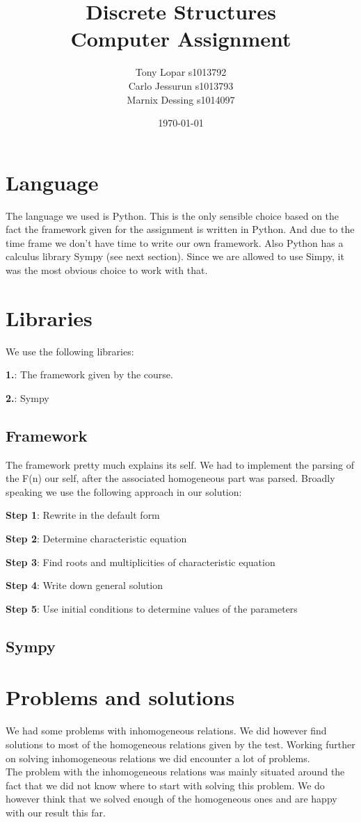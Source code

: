 \documentclass{article}
\begin{document}
\title{Discrete Structures \\ Computer Assignment}
\date{\today}
\author{Tony Lopar s1013792 \\ Carlo Jessurun s1013793 \\ Marnix Dessing s1014097}
\maketitle

\section{Language}
The language we used is Python. This is the only sensible choice based on the fact the framework given for the assignment is written in Python. And due to the time frame we don't have time to write our own framework. Also Python has a calculus library Sympy (see next section). Since we are allowed to use Simpy, it was the most obvious choice to work with that.

\section{Libraries}
We use the following libraries:

\textbf{1.}: The framework given by the course.

\textbf{2.}: Sympy

\subsection{Framework}
The framework pretty much explains its self.
We had to implement the parsing of the F(n) our self, after the associated homogeneous part was parsed. Broadly speaking we use the following approach in our solution:

\textbf{Step 1}: Rewrite in the default form

\textbf{Step 2}: Determine characteristic equation

\textbf{Step 3}: Find roots and multiplicities of characteristic equation

\textbf{Step 4}: Write down general solution

\textbf{Step 5}: Use initial conditions to determine values of the parameters

\newpage
\subsection{Sympy}

\section{Problems and solutions}
We had some problems with inhomogeneous relations. We did however find solutions to most of the homogeneous relations given by the test. Working further on solving inhomogeneous relations we did encounter a lot of problems.
\\
The problem with the inhomogeneous relations was mainly situated around the fact that we did not know where to start with solving this problem.
We do however think that we solved enough of the homogeneous ones and are happy with our result this far.
\end{document}
